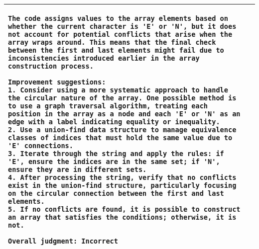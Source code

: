 \begin{table}[]
\begin{longtable}{m{}m{}}
\begin{lstlisting}[frame=none,
    backgroundcolor=\color{white},
    numbers=none,
    xleftmargin=0pt,
    framexleftmargin=0pt,
    framexrightmargin=0pt,
    framextopmargin=0pt,
    framexbottommargin=0pt]
The code assigns values to the array elements based on whether the current character is 'E' or 'N', but it does not account for potential conflicts that arise when the array wraps around. This means that the final check between the first and last elements might fail due to inconsistencies introduced earlier in the array construction process.

Improvement suggestions:
1. Consider using a more systematic approach to handle the circular nature of the array. One possible method is to use a graph traversal algorithm, treating each position in the array as a node and each 'E' or 'N' as an edge with a label indicating equality or inequality.
2. Use a union-find data structure to manage equivalence classes of indices that must hold the same value due to 'E' connections.
3. Iterate through the string and apply the rules: if 'E', ensure the indices are in the same set; if 'N', ensure they are in different sets.
4. After processing the string, verify that no conflicts exist in the union-find structure, particularly focusing on the circular connection between the first and last elements.
5. If no conflicts are found, it is possible to construct an array that satisfies the conditions; otherwise, it is not.

Overall judgment: Incorrect
\end{lstlisting}
\\ 
\bottomrule
\end{longtable}
\end{table}
